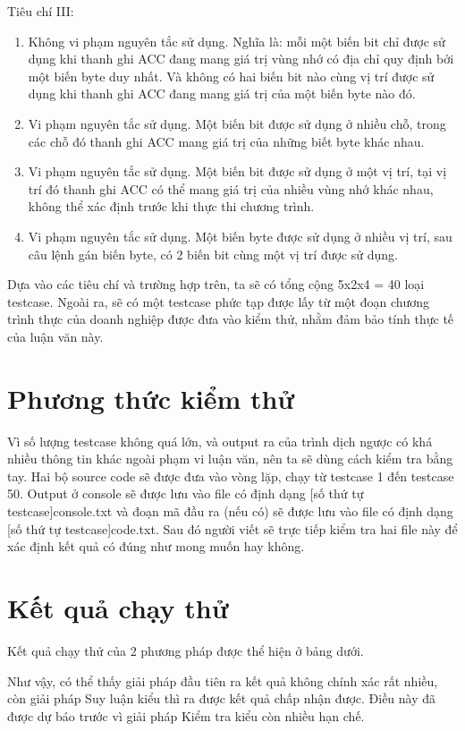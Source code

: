 Tiêu chí III:
\begin{enumerate}
	\item Không vi phạm nguyên tắc sử dụng. Nghĩa là: mỗi một biến bit chỉ được sử dụng khi thanh ghi ACC đang mang giá trị vùng nhớ có địa chỉ quy định bởi một biến byte duy nhất. Và không có hai biến bit nào cùng vị trí được sử dụng khi thanh ghi ACC đang mang giá trị của một biến byte nào đó.
	\item Vi phạm nguyên tắc sử dụng. Một biến bit được sử dụng ở nhiều chỗ, trong các chỗ đó thanh ghi ACC mang giá trị của những biết byte khác nhau.
	\item Vi phạm nguyên tắc sử dụng. Một biến bit được sử dụng ở một vị trí, tại vị trí đó thanh ghi ACC có thể mang giá trị của nhiều vùng nhớ khác nhau, không thể xác định trước khi thực thi chương trình.
	\item Vi phạm nguyên tắc sử dụng. Một biến byte được sử dụng ở nhiều vị trí, sau câu lệnh gán biến byte, có 2 biến bit cùng một vị trí được sử dụng.
\end{enumerate}

Dựa vào các tiêu chí và trường hợp trên, ta sẽ có tổng cộng 5x2x4 = 40 loại testcase. Ngoài ra, sẽ có một testcase phức tạp được lấy từ một đoạn chương trình thực của doanh nghiệp được đưa vào kiểm thử, nhằm đảm bảo tính thực tế của luận văn này.


\section{Phương thức kiểm thử}
Vì số lượng testcase không quá lớn, và output ra của trình dịch ngược có khá nhiều thông tin khác ngoài phạm vi luận văn, nên ta sẽ dùng cách kiểm tra bằng tay. Hai bộ source code sẽ được đưa vào vòng lặp, chạy từ testcase 1 đến testcase 50. Output ở console sẽ được lưu vào file có định dạng [số thứ tự testcase]console.txt và đoạn mã đầu ra (nếu có) sẽ được lưu vào file có định dạng [số thứ tự testcase]code.txt. Sau đó người viết sẽ trực tiếp kiểm tra hai file này để xác định kết quả có đúng như mong muốn hay không. 


\section{Kết quả chạy thử}

Kết quả chạy thử của 2 phương pháp được thể hiện ở bảng dưới.


Như vậy, có thể thấy giải pháp đầu tiên ra kết quả không chính xác rất nhiều, còn giải pháp Suy luận kiểu thì ra được kết quả chấp nhận được. Điều này đã được dự báo trước vì giải pháp Kiểm tra kiểu còn nhiều hạn chế.

